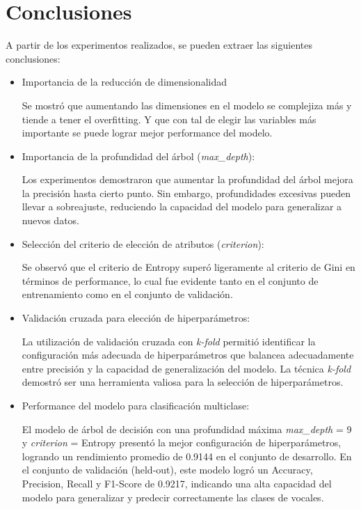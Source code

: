 \documentclass[11pt,a4paper, twocolumn]{article}
\begin{document}
\section{Conclusiones}

A partir de los experimentos realizados, se pueden extraer las siguientes conclusiones:

\begin{itemize}

\item
        Importancia de la reducción de dimensionalidad

 	Se mostró que aumentando las dimensiones en el modelo se complejiza más y tiende a tener el overfitting. Y que con tal de elegir las variables más importante se puede lograr mejor performance del modelo.
	
\item
	Importancia de la profundidad del árbol (\textit{max\_depth}):

	Los experimentos demostraron que aumentar la profundidad del árbol mejora la precisión hasta cierto punto. Sin embargo, profundidades excesivas pueden llevar a sobreajuste, reduciendo la capacidad del modelo para generalizar a nuevos datos.

\item
	Selección del criterio de elección de atributos (\textit{criterion}):

	Se observó que el criterio de Entropy superó ligeramente al criterio de Gini en términos de performance, lo cual fue evidente tanto en el conjunto de entrenamiento como en el conjunto de validación.

\item
	Validación cruzada para elección de hiperparámetros:

	La utilización de validación cruzada con \textit{k-fold} permitió identificar la configuración más adecuada de hiperparámetros que balancea adecuadamente entre precisión y la capacidad de generalización del modelo.  
	La técnica \textit{k-fold} demostró ser una herramienta valiosa para la selección de hiperparámetros.

\item
	Performance del modelo para clasificación multiclase:

	El modelo de árbol de decisión con una profundidad máxima \textit{max\_depth} = 9 y \textit{criterion} = Entropy presentó la mejor configuración de hiperparámetros, logrando un rendimiento promedio de 0.9144 en el conjunto de desarrollo.
	En el conjunto de validación (held-out), este modelo logró un Accuracy, Precision, Recall y F1-Score de 0.9217, indicando una alta capacidad del modelo para generalizar y predecir correctamente las clases de vocales. 

\end{itemize}
\end{document}
